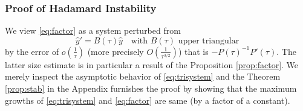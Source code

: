 \documentclass[a4paper,11pt]{article}
\theoremstyle{remark}
\begin{document}
{\subsubsection{Proof of Hadamard Instability}

We view \eqref{eq:factor} as a system perturbed from
\begin{equation} \label{eq:trisystem}
  \hat{y}' = B(\tau)\hat{y} \quad \text{with $B(\tau)$ upper triangular}
\end{equation}
by the error of $o(\frac{1}{\tau})$ (more precisely $O(\frac{1}{\tau^{3/2}})$) that is $- P(\tau)^{-1}P'(\tau)$. The latter size estimate is in particular a result of the Proposition \ref{prop:factor}. We merely inspect the asymptotic behavior of \eqref{eq:trisystem} and the Theorem \ref{prop:stab} in the Appendix furnishes the proof by showing that the maximum growths of \eqref{eq:trisystem} and \eqref{eq:factor} are same (by a factor of a constant). %

}
\end{document}
